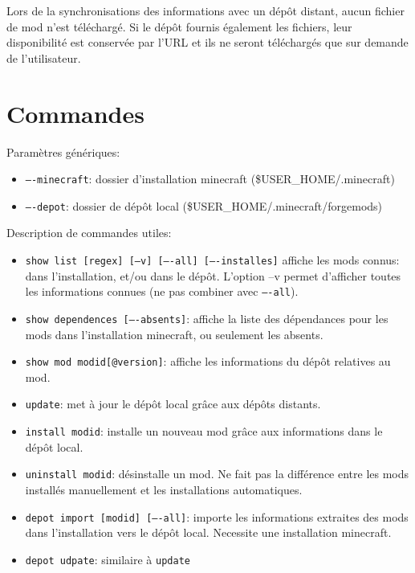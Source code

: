 \documentclass{article}
\begin{document}
Lors de la synchronisations des informations avec un dépôt distant, aucun fichier de mod n'est téléchargé.
Si le dépôt fournis également les fichiers, leur disponibilité est conservée par l'URL et ils ne seront téléchargés que sur demande de l'utilisateur.


\section{Commandes}
Paramètres génériques:
\begin{itemize}
    \item \texttt{----minecraft}: dossier d'installation minecraft (\$USER\_HOME/.minecraft)
    \item \texttt{----depot}: dossier de dépôt local (\$USER\_HOME/.minecraft/forgemods)
\end{itemize}

\medskip
Description de commandes utiles:
\begin{itemize}
    \item \texttt{show list [regex] [--v] [----all] [----installes]} affiche les mods connus: dans l'installation, et/ou dans le dépôt.
L'option --v permet d'afficher toutes les informations connues (ne pas combiner avec \texttt{----all}).
    \item \texttt{show dependences [----absents]}: affiche la liste des dépendances pour les mods dans l'installation minecraft, ou seulement les absents.
    \item \texttt{show mod modid[@version]}: affiche les informations du dépôt relatives au mod.
    \item \texttt{update}: met à jour le dépôt local grâce aux dépôts distants.
    \item \texttt{install modid}: installe un nouveau mod grâce aux informations dans le dépôt local.
    \item \texttt{uninstall modid}: désinstalle un mod. Ne fait pas la différence entre les mods installés manuellement et les installations automatiques.
    \item \texttt{depot import [modid] [----all]}: importe les informations extraites des mods dans l'installation vers le dépôt local.
Necessite une installation minecraft.
    \item \texttt{depot udpate}: similaire à \texttt{update}
\end{itemize}
\end{document}
